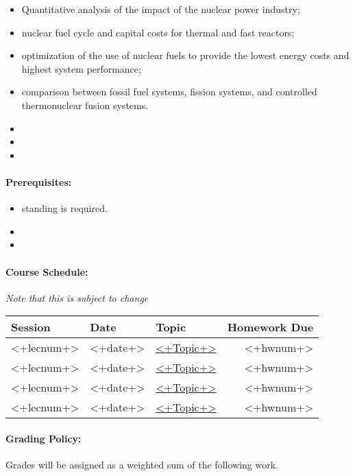\documentclass[11pt, a4paper]{article}
\begin{document}
\begin{itemize}
\item Quantitative analysis of the impact of the nuclear power industry; 
\item nuclear fuel cycle and capital costs for thermal and fast reactors; 
\item optimization of the use of nuclear fuels to provide the lowest energy costs and highest system performance; 
\item comparison between fossil fuel systems, fission systems, and controlled thermonuclear fusion systems.
\item <+objective+>
\item <+objective+>
\item <+objective+>
\end{itemize}

\paragraph{Prerequisites:} 
\begin{itemize}
\item <+standing+> standing is required.
\item <+required courses+>
\item <+other+>
\end{itemize}

\paragraph{Course Schedule:}
\textit{Note that this is subject to change}

\begin{table}[h]
\begin{tabularx}{\textwidth}{llXr}
\textbf{Session} & \textbf{Date} & \textbf{Topic} & \textbf{Homework Due}\\
\hline
<+lecnum+> & <+date+> & \href{<+url>}{<+Topic+>} & <+hwnum+>\\
<+lecnum+> & <+date+> & \href{<+url>}{<+Topic+>} & <+hwnum+>\\
<+lecnum+> & <+date+> & \href{<+url>}{<+Topic+>} & <+hwnum+>\\
<+lecnum+> & <+date+> & \href{<+url>}{<+Topic+>} & <+hwnum+>\\
\hline
\end{tabularx}
\end{table}

\paragraph{Grading Policy:} Grades will be assigned as a weighted sum of the following work. 
\end{document}
